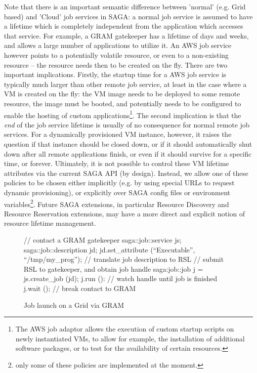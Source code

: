 \documentclass[3p,twocolumn]{elsarticle}
\newcommand{\upp}{\vspace*{-0.6em}}
\newcommand{\I}[1]{\textit{#1}}
\begin{document}
Note that there is an important semantic difference between 'normal'
(e.g. Grid based) and 'Cloud' job services in SAGA: a normal job
service is assumed to have a lifetime which is completely independent
from the application which accesses that service.  For example, a GRAM
gatekeeper has a lifetime of days and weeks, and allows a large number
of applications to utilize it.  An AWS job service however points to a
potentially volatile resource, or even to a non-existing resource --
the resource needs then to be created on the fly.  There are two
important implications.  Firstly, the startup time for a AWS job
service is typically much larger than other remote job service, at
least in the case where a VM is created on the fly: the VM image needs
to be deployed to some remote resource, the image must be booted, and
potentially needs to be configured to enable the hosting of custom
applications\footnote{The AWS job adaptor allows the execution of
  custom startup scripts on newly instantiated VMs, to allow for
  example, the installation of additional software packages, or to
  test for the availability of certain resources.}.  The second
implication is that the \I{end} of the job service lifetime is usually
of no consequence for normal remote job services.  For a dynamically
provisioned VM instance, however, it raises the question if that
instance should be closed down, or if it should automatically shut
down after all remote applications finish, or even if it should
survive for a specific time, or forever.  Ultimately, it is not
possible to control these VM lifetime attributes via the current SAGA
API (by design).  Instead, we allow one of these policies to be
chosen either implicitly (e.g. by using special URLs to request
dynamic provisioning), or explicitly over SAGA config files or
environment variables\footnote{only some of these policies are
  implemented at the moment.}.  Future SAGA extensions, in particular
Resource Discovery and Resource Reservation extensions, may have a
more direct and explicit notion of resource lifetime management.

\begin{figure}[!ht]
\upp 
 \begin{center}
  \begin{mycode}[label=SAGA Job Launch via GRAM gatekeeper]
  { // contact a GRAM gatekeeper
    saga::job::service     js;
    saga::job::description jd;
    jd.set_attribute (``Executable'', ``/tmp/my_prog'');
    // translate job description to RSL
    // submit RSL to gatekeeper, and obtain job handle
    saga:job::job j = js.create_job (jd);
    j.run ():
    // watch handle until job is finished
    j.wait ();
   } // break contact to GRAM
  \end{mycode}
  \caption{\label{gramjob}Job launch on a Grid via GRAM\vspace*{-2em}}
 \end{center}

\end{figure}
\end{document}
